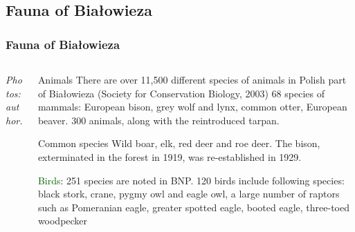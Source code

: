 \documentclass[pdflatex,compress,8pt,
	xcolor={dvipsnames,dvipsnames,svgnames,x11names,table},
	hyperref={colorlinks = true,
	breaklinks = true, urlcolor = NavyBlue, breaklinks = true}]{beamer}
\begin{document}
\subsection{Fauna of Białowieza}
\begin{frame}\frametitle{Fauna of Białowieza}

\begin{minipage}[0.4\textheight]{\textwidth}
\begin{columns}[T]
\begin{column}{0.5\textwidth}
\vspace{5em}
\begin{figure}[H]
	\centering
			\hspace{2mm}
			\vspace{2mm}
			\hspace{2mm}
\end{figure}
\emph{Photos: author.}
\end{column}
\begin{column}{0.5\textwidth}
\vspace{4em} 
\begin{block}{Animals}
There are over 11,500 different species of animals in Polish part of Białowieza (Society for Conservation Biology, 2003) 
68 species of mammals: European bison, grey wolf and lynx, common otter, European beaver. 300 animals, along with the reintroduced tarpan. 
\end{block}

\begin{alertblock}{Common species}
Wild boar, elk, red deer and roe deer. The bison, exterminated in the forest in 1919, was re-established in 1929. 
\end{alertblock}

\begin{examples}{\textcolor{DarkGreen}{Birds}:}
251 species are noted in BNP. 120 birds include following species: black stork, crane, pygmy owl and eagle owl, a large number of raptors such as Pomeranian eagle, greater spotted eagle, booted eagle, three-toed woodpecker
\end{examples}
\end{column}
\end{columns}
\end{minipage}
\end{frame}
\end{document}
